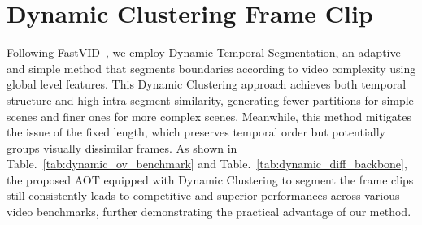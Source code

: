 \section{Dynamic Clustering Frame Clip}
\label{sec:dynamic_clip}


Following FastVID~\cite{shen2025fastvid}, we employ Dynamic Temporal Segmentation, an adaptive and simple method that segments boundaries according to video complexity using global level features. This Dynamic Clustering approach achieves both temporal structure and high intra-segment similarity, generating fewer partitions for simple scenes and finer ones for more complex scenes. Meanwhile, this method mitigates the issue of the fixed length, which preserves temporal order but potentially groups visually dissimilar frames. As shown in Table.~\ref{tab:dynamic_ov_benchmark} and Table.~\ref{tab:dynamic_diff_backbone}, the proposed AOT equipped with Dynamic Clustering to segment the frame clips still consistently leads to competitive and superior performances across various video benchmarks, further demonstrating the practical advantage of our method.



